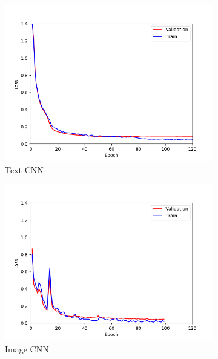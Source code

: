 \documentclass{article} %
\begin{document}
\begin{figure}
    \centering
    \begin{subfigure}[b]{0.3\textwidth}
        \centering
        \includegraphics[width=\textwidth]{html_val_train.png}
        \caption{Text CNN}
        \label{fig:html_loss}
    \end{subfigure}
    \hfill
        \hfill
    \begin{subfigure}[b]{0.3\textwidth}
        \centering
        \includegraphics[width=\textwidth]{png_val_train.png}
        \caption{Image CNN}
        \label{fig:image_loss}
    \end{subfigure}
   \hfill
    \begin{subfigure}[b]{0.3\textwidth}

\end{subfigure}
\end{figure}
\end{document}

